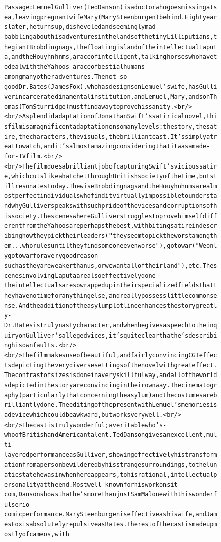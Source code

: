 \begin{figure}[t]
{{\begin{alltt}
Passage: Lemuel Gulliver (Ted Danson) is a doctor who goes missing at sea, leaving pregnant wife Mary (Mary Steenburgen) behind. Eight years later, he turns up, disheveled and seemingly mad - babbling about his adventures in the lands of the tiny Lilliputians, the giant Brobdingnags, the floating island of the intellectual Laputa, and the Houyhnhnms, a race of intelligent, talking horses who have to deal with the Yahoos - a race of bestial humans - among many other adventures. The not-so-good Dr. Bates (James Fox), who has designs on Lemuel's wife, has Gulliver incarcerated in a mental institution, and Lemuel, Mary, and son Thomas (Tom Sturridge) must find a way to prove his sanity.<br /><br />A splendid adaptation of Jonathan Swift's satirical novel, this film is a magnificent adaptation on so many levels: the story, the satire, the characters, the visuals, the brilliant cast. It's simply a treat to watch, and it's almost amazing considering that it was a made-for-TV film.<br /><br />The film does a brilliant job of capturing Swift's vicious satire, which cuts like a hatchet through British society of the time, but still resonates today. The wise Brobdingnags and the Houyhnhnms are almost perfect individuals who find it virtually impossible to understand why Gulliver speaks with such pride of the vices and corruptions of his society. The scenes where Gulliver struggles to prove himself different from the Yahoos are perhaps the best, with biting satire in describing how they pick their leaders ("they seem to pick the worst among them. . . who rules until they find someone even worse"), go to war ("We only go to war for a very good reason - such as they are weaker than us, or we want all of their land"), etc. The scenes involving Laputa are also effectively done - the intellectuals are so wrapped up in their specialized fields that they have no time for anything else, and really possess little common sense. And the addition of the asylum plot line enhances the story greatly - Dr. Bates is truly nasty character, and when he gives a speech to the inquiry on Gulliver's alleged vices, it's quite clear that he's describing his own faults.<br /><br />The film makes use of beautiful, and fairly convincing CGI effects depicting the very diverse settings of the novel with great effect. The contrast of sizes is done in a very skillful way, and all of the worlds depicted in the story are convincing in their own way. The cinematography (particularly that concerning the asylum) and the costumes are brilliantly done. The editing of the present with Lemuel's memories is a device which could be awkward, but works very well.<br /><br />The cast is truly wonderful; a veritable who's-who of British and American talent. Ted Danson gives an excellent, multi-layered performance as Gulliver, showing effectively his transformation from a person bewildered by his strange surroundings, to the lunatic state he was in when he reappears, to his rational, intellectual personality at the end. Most well-known for his work on sit-com, Danson shows that he's more than just Sam Malone with this wonderful serio-comic performance. Mary Steenburgen is effective as his wife, and James Fox is absolutely repulsive as Bates. The rest of the cast is made up mostly of cameos, with 
\end{alltt}}}
\end{figure}
